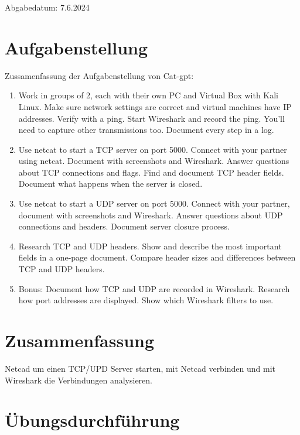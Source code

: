 \documentclass[a4paper]{article}
\begin{document}
Abgabedatum:	7.6.2024


\newpage
\tableofcontents

\newpage

\section{Aufgabenstellung}
Zussamenfassung der Aufgabenstellung von Cat-gpt:
\begin{enumerate}
	\item
	      Work in groups of 2, each with their own PC and Virtual Box with Kali Linux. Make sure network settings are correct and virtual machines have IP addresses. Verify with a ping. Start Wireshark and record the ping. You'll need to capture other transmissions too. Document every step in a log.
	\item
	      Use netcat to start a TCP server on port 5000. Connect with your partner using netcat. Document with screenshots and Wireshark. Answer questions about TCP connections and flags. Find and document TCP header fields. Document what happens when the server is closed.
	\item
	      Use netcat to start a UDP server on port 5000. Connect with your partner, document with screenshots and Wireshark. Answer questions about UDP connections and headers. Document server closure process.
	\item
	      Research TCP and UDP headers. Show and describe the most important fields in a one-page document. Compare header sizes and differences between TCP and UDP headers.
	\item
	      Bonus: Document how TCP and UDP are recorded in Wireshark. Research how port addresses are displayed. Show which Wireshark filters to use.
\end{enumerate}





\section{Zusammenfassung}
Netcad um einen TCP/UPD Server starten, mit Netcad verbinden und mit Wireshark die Verbindungen analysieren.


\newpage

\section{Übungsdurchführung}
\end{document}
